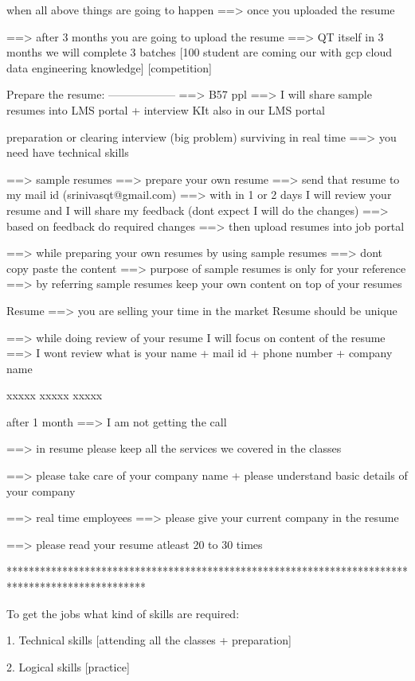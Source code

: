 	when all above things are going to happen ==> once you uploaded the resume
	
==> after 3 months you are going to upload the resume ==> QT itself in 3 months we will complete 3 batches [100 student are coming our with gcp cloud data engineering knowledge] [competition]


Prepare the resume:
------------------
	==> B57 ppl ==> I will share sample resumes into LMS portal + interview KIt also in our LMS portal
	
	
	preparation or clearing interview (big problem)
	surviving in real time ==> you need have technical skills 
	
	==> sample resumes ==> prepare your own resume ==> send that resume to my mail id (srinivasqt@gmail.com) ==> with in 1 or 2 days I will review your resume and I will share my feedback (dont expect I will do the changes) ==> based on feedback do required changes ==> then upload resumes into job portal 
	
	==> while preparing your own resumes by using sample resumes ==> dont copy paste the content 
	==> purpose of sample resumes is only for your reference ==> by referring sample resumes keep your own content on top of your resumes
	
	Resume ==> you are selling your time in the market
	Resume should be unique
	
	==> while doing review of your resume I will focus on content of the resume ==> I wont review what is your name + mail id + phone number + company name 
	
	xxxxx
	xxxxx
	xxxxx
	
	after 1 month ==> I am not getting the call 
	
	==> in resume please keep all the services we covered in the classes 
	
	==> please take care of your company name + please understand basic details of your company 
	
	==> real time employees ==> please give your current company in the resume 
	
	==> please read your resume atleast 20 to 30 times
	
*************************************************************************************************

To get the jobs what kind of skills are required:

1. Technical skills [attending all the classes + preparation]

2. Logical skills [practice]

